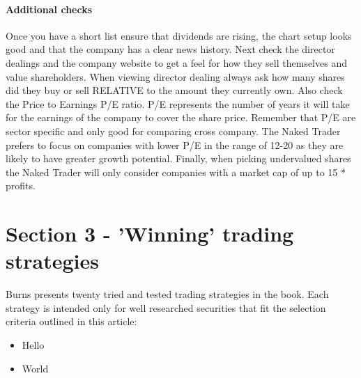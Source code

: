 \paragraph{Additional checks}
Once you have a short list ensure that dividends are rising, the chart setup looks good and that the company has a clear news history.
Next check the director dealings and the company website to get a feel for how they sell themselves and value shareholders.
When viewing director dealing always ask how many shares did they buy or sell RELATIVE to the amount they currently own.
Also check the Price to Earnings P/E ratio.
P/E represents the number of years it will take for the earnings of the company to cover the share price.
Remember that P/E are sector specific and only good for comparing cross company. 
The Naked Trader prefers to focus on companies with lower P/E in the range of 12-20 as they are likely to have greater growth potential.
Finally, when picking undervalued shares the Naked Trader will only consider companies with a market cap of up to 15 * profits.


\section*{Section 3 - 'Winning' trading strategies}
Burns presents twenty tried and tested trading strategies in the book.
Each strategy is intended only for well researched securities that fit the selection criteria outlined in this article:
\begin{itemize}
\item Hello
\item World
\end{itemize}






















